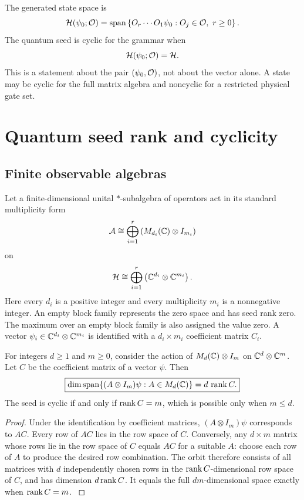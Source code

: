 The generated state space is
\[
\cH(\psi_0;\cO)
=
\operatorname{span}
\left\{
O_r\cdots O_1\psi_0:
O_j\in\cO,
\ r\ge0
\right\}.
\]
The quantum seed is cyclic for the grammar when
\[
\cH(\psi_0;\cO)=\cH.
\]
This is a statement about the pair $(\psi_0,\cO)$, not about the vector alone. A state may be cyclic for the full matrix algebra and noncyclic for a restricted physical gate set.

\section{Quantum seed rank and cyclicity}\label{core:section:002}

\subsection{Finite observable algebras}

Let a finite-dimensional unital $*$-subalgebra of operators act in its standard multiplicity form
\[
\cA
\cong
\bigoplus_{i=1}^r
\left(M_{d_i}(\bbC)\otimes I_{m_i}\right)
\]
on
\[
\cH
\cong
\bigoplus_{i=1}^r
\left(\bbC^{d_i}\otimes\bbC^{m_i}\right).
\]
Here every $d_i$ is a positive integer and every multiplicity $m_i$ is a nonnegative integer. An empty block family represents the zero space and has seed rank zero. The maximum over an empty block family is also assigned the value zero. A vector $\psi_i\in\bbC^{d_i}\otimes\bbC^{m_i}$ is identified with a $d_i\times m_i$ coefficient matrix $C_i$.

\begin{theorem}\label{core:theorem:001}\label{core:thm:seed-orbit}
For integers $d\ge1$ and $m\ge0$, consider the action of $M_d(\bbC)\otimes I_m$ on $\bbC^d\otimes\bbC^m$. Let $C$ be the coefficient matrix of a vector $\psi$. Then
\[
\boxed{
\dim\operatorname{span}\{(A\otimes I_m)\psi:A\in M_d(\bbC)\}
=d\,\rank C.
}
\]
The seed is cyclic if and only if $\operatorname{rank} C=m$, which is possible only when $m\le d$.
\end{theorem}

\begin{proof}\label{core:proof:001}
Under the identification by coefficient matrices, $(A\otimes I_m)\psi$ corresponds to $AC$. Every row of $AC$ lies in the row space of $C$. Conversely, any $d\times m$ matrix whose rows lie in the row space of $C$ equals $AC$ for a suitable $A$: choose each row of $A$ to produce the desired row combination. The orbit therefore consists of all matrices with $d$ independently chosen rows in the $\operatorname{rank} C$-dimensional row space of $C$, and has dimension $d\operatorname{rank} C$. It equals the full $dm$-dimensional space exactly when $\operatorname{rank} C=m$.
\label{core:proof:001:end}\end{proof}

